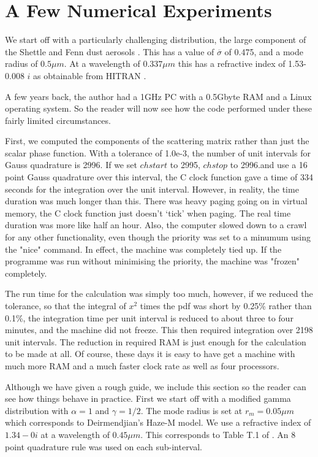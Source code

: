 \documentclass[12pt]{article}
\begin{document}
\section{A Few Numerical Experiments}

\begin{flushleft}

We start off with a particularly challenging distribution, the large component
of the Shettle and Fenn dust aerosols \cite{ShettleFenn:Miebib}. This has
a value of $\overline \sigma$ of 0.475, and a mode radius of $0.5\mu m$.
At a wavelength of $0.337 \mu m$ this has a refractive index of 1.53-0.008 $i$
 as obtainable from  HITRAN \cite{RothmanETAL:Miebib}. 

A few years back, the  author had a 1GHz PC with a 0.5Gbyte RAM and a Linux
 operating system. So the reader
will now see how the code performed under these fairly limited circumstances.

First, we computed the components of the scattering matrix rather than just the
 scalar phase function.
With a tolerance of 1.0e-3, the number of unit intervals for Gauss quadrature
is 2996.  If we set $chstart$ to 2995, $chstop$ to 2996.and use a 16 point Gauss quadrature
 over this interval, the C clock function gave a time of 334 seconds for the 
integration over the unit interval. However, in reality, the time duration was much longer than this.
There was heavy paging going on in virtual memory, the C clock function
just doesn't `tick' when paging. The real time duration was more like half an hour.
 Also, the computer slowed down to a crawl for any other functionality, even though the priority
 was set to a minumum using the "nice" command. In effect, the machine was completely tied up.
 If the programme was run without minimising the priority, the machine was "frozen" completely. 

The run time for the calculation was simply too much, however, if we reduced the 
tolerance, so that the integral of $x^2$ times the pdf was short by 0.25\% rather
 than 0.1\%, the 
integration time per unit interval is reduced to about three to four minutes, and the 
machine did not freeze. This then required integration over 2198 unit intervals.
The reduction in required RAM is just enough for the calculation to be made at all. 
Of course, these days it is easy  to have get a machine with much more RAM and 
a much faster clock rate as well as four processors.


Although we have given a rough guide, we include this section so the reader
can see how things behave in practice. First we start off with a modified 
gamma distribution with $\alpha=1$ and $\gamma=1/2$. The mode radius is
set at $r_m=0.05 \mu m$ which corresponds to Deirmendjian's Haze-M model.
We use a refractive index of $1.34-0 i$ at a wavelength of $0.45 \mu m$. This corresponds to Table T.1
of \cite{Deirmendjian:Miebib}. An 8 point quadrature rule 
was used on each sub-interval.


\end{flushleft}
\end{document}

